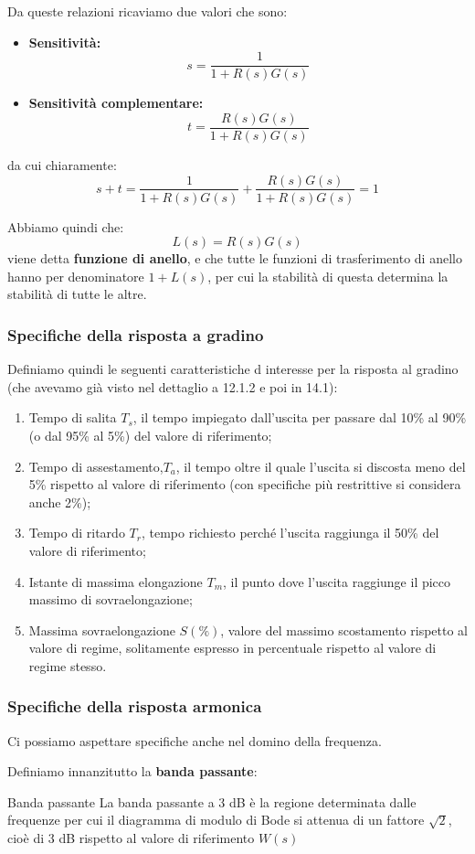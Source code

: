 \documentclass[a4paper,11pt]{article}
\begin{document}
Da queste relazioni ricaviamo due valori che sono:
\begin{itemize}
	\item \textbf{Sensitività:}
		$$
		s = \frac{1}{1 + R(s) G(s)}
		$$
	\item \textbf{Sensitività complementare:}
		$$
		t = \frac{R(s) G(s)}{1 + R(s) G(s)}
		$$
\end{itemize}
da cui chiaramente:
$$
s + t = \frac{1}{1 + R(s) G(s)} + \frac{R(s) G(s)}{1 + R(s) G(s)} = 1
$$

Abbiamo quindi che:
$$
L(s) = R(s) G(s)
$$
viene detta \textbf{funzione di anello}, e che tutte le funzioni di trasferimento di anello hanno per denominatore $1 + L(s)$, per cui la stabilità di questa determina la stabilità di tutte le altre.

\subsubsection{Specifiche della risposta a gradino}
Definiamo quindi le seguenti caratteristiche d interesse per la risposta al gradino (che avevamo già visto nel dettaglio a 12.1.2 e poi in 14.1):
\begin{enumerate}
	\item Tempo di salita $T_s$, il tempo impiegato dall'uscita per passare dal 10\% al 90\% (o dal 95\% al 5\%) del valore di riferimento;
	\item Tempo di assestamento,$T_a$, il tempo oltre il quale l'uscita si discosta meno del 5\% rispetto al valore di riferimento (con specifiche più restrittive si considera anche 2\%);
	\item Tempo di ritardo $T_r$, tempo richiesto perché l'uscita raggiunga il 50\% del valore di riferimento;
	\item Istante di massima elongazione $T_m$, il punto dove l'uscita raggiunge il picco massimo di sovraelongazione;
	\item Massima sovraelongazione $S(\%)$, valore del massimo scostamento rispetto al valore di regime, solitamente espresso in percentuale rispetto al valore di regime stesso.
\end{enumerate}

\subsubsection{Specifiche della risposta armonica}
Ci possiamo aspettare specifiche anche nel domino della frequenza.

Definiamo innanzitutto la \textbf{banda passante}:
\begin{definition}{Banda passante}
	La banda passante a 3 dB è la regione determinata dalle frequenze per cui il diagramma di modulo di Bode si attenua di un fattore $\sqrt{2}$, cioè di 3 dB rispetto al valore di riferimento $W(s)$ 
\end{definition}
\end{document}
